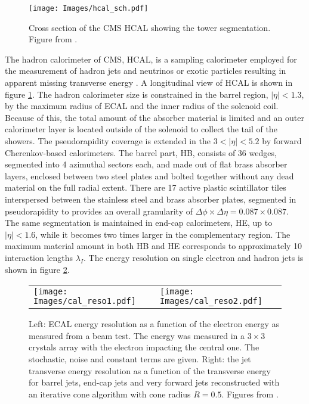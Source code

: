 \begin{figure}
\centering
\texttt{[image: Images/hcal\_sch.pdf]}
\caption{Cross section of the CMS HCAL showing the tower segmentation.
Figure from \cite{HCA}.}
\label{hcal_sch}
\end{figure}
The hadron calorimeter of CMS, HCAL, is a sampling calorimeter employed
for the measurement of hadron jets and neutrinos or exotic particles resulting in
apparent missing transverse energy \cite{HCA}. A longitudinal view of HCAL is shown
in figure \ref{hcal_sch}. The hadron calorimeter size is constrained in the barrel region,
$|\eta|<1.3$, by the maximum radius of ECAL and the inner radius of the solenoid
coil. Because of this, the total amount of the absorber material is limited and
an outer calorimeter layer is located outside of the solenoid to collect the tail
of the showers. The pseudorapidity coverage is extended in the $3<|\eta|<5.2$ by
forward Cherenkov-based calorimeters. The barrel part, HB, consists of 36 wedges,
segmented into 4 azimuthal sectors each, and made out of flat brass absorber
layers, enclosed between two steel plates and bolted together without any dead
material on the full radial extent. There are 17 active plastic scintillator tiles
interspersed between the stainless steel and brass absorber plates, segmented in
pseudorapidity to provides an overall granularity of $\Delta\phi\times\Delta\eta=0.087\times0.087$. The
same segmentation is maintained in end-cap calorimeters, HE, up to $|\eta|<1.6$,
while it becomes two times larger in the complementary region. The maximum
material amount in both HB and HE corresponds to approximately 10 interaction
lengths $\lambda_I$. The energy resolution on single electron and hadron jets is shown in
figure \ref{cal_reso}.
\begin{figure}
\centering
\begin{tabular}{@{}p{}@{} p{}@{}}
\texttt{[image: Images/cal\_reso1.pdf]}&
\texttt{[image: Images/cal\_reso2.pdf]}
\end{tabular}
\caption{Left: ECAL energy resolution as a function of the electron energy
as measured from a beam test. The energy was measured in a $3\times3$ crystals array
with the electron impacting the central one. The stochastic, noise and constant
terms are given. Right: the jet transverse energy resolution as a function of the
transverse energy for barrel jets, end-cap jets and very forward jets reconstructed
with an iterative cone algorithm with cone radius $R=0.5$. Figures from \cite{CMS}.}
\label{cal_reso}
\end{figure}

